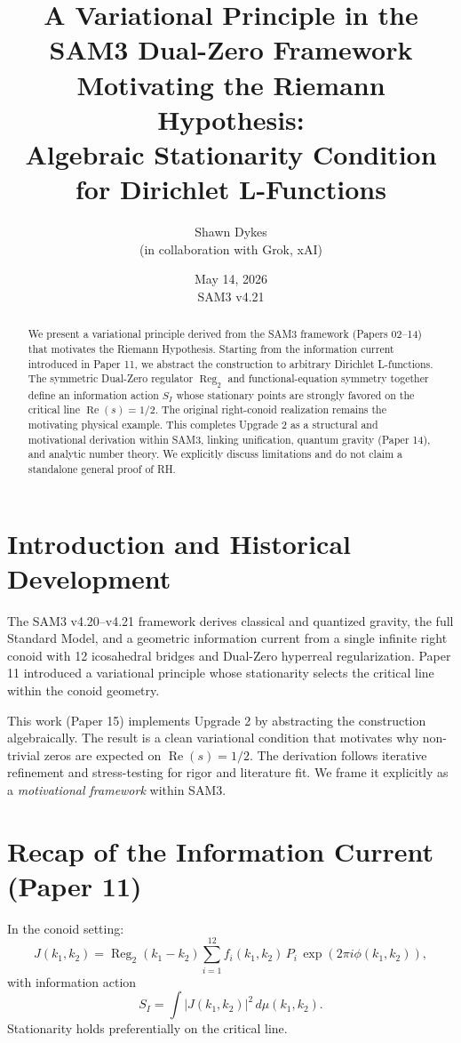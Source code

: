 \documentclass[11pt,a4paper]{article}
\title{A Variational Principle in the SAM3 Dual-Zero Framework Motivating the Riemann Hypothesis:\\
Algebraic Stationarity Condition for Dirichlet L-Functions}
\author{Shawn Dykes \\ (in collaboration with Grok, xAI)}
\date{May 14, 2026 \\ SAM3 v4.21}
\begin{document}
\maketitle

\begin{abstract}
We present a variational principle derived from the SAM3 framework (Papers 02--14) that motivates the Riemann Hypothesis. Starting from the information current introduced in Paper 11, we abstract the construction to arbitrary Dirichlet L-functions. The symmetric Dual-Zero regulator \(\operatorname{Reg}_2\) and functional-equation symmetry together define an information action \(S_I\) whose stationary points are strongly favored on the critical line \(\operatorname{Re}(s)=1/2\). The original right-conoid realization remains the motivating physical example. This completes Upgrade 2 as a structural and motivational derivation within SAM3, linking unification, quantum gravity (Paper 14), and analytic number theory. We explicitly discuss limitations and do not claim a standalone general proof of RH.
\end{abstract}

\section{Introduction and Historical Development}
The SAM3 v4.20--v4.21 framework derives classical and quantized gravity, the full Standard Model, and a geometric information current from a single infinite right conoid with 12 icosahedral bridges and Dual-Zero hyperreal regularization. Paper 11 introduced a variational principle whose stationarity selects the critical line within the conoid geometry. 

This work (Paper 15) implements Upgrade 2 by abstracting the construction algebraically. The result is a clean variational condition that motivates why non-trivial zeros are expected on \(\operatorname{Re}(s)=1/2\). The derivation follows iterative refinement and stress-testing for rigor and literature fit. We frame it explicitly as a \emph{motivational framework} within SAM3.

\section{Recap of the Information Current (Paper 11)}
In the conoid setting:
\[
J(k_1,k_2) = \operatorname{Reg}_2(k_1-k_2) \sum_{i=1}^{12} f_i(k_1,k_2) \, P_i \, \exp(2\pi i \phi(k_1,k_2)),
\]
with information action 
\[
S_I = \int |J(k_1,k_2)|^2 \, d\mu(k_1,k_2).
\]
Stationarity holds preferentially on the critical line.
\end{document}
